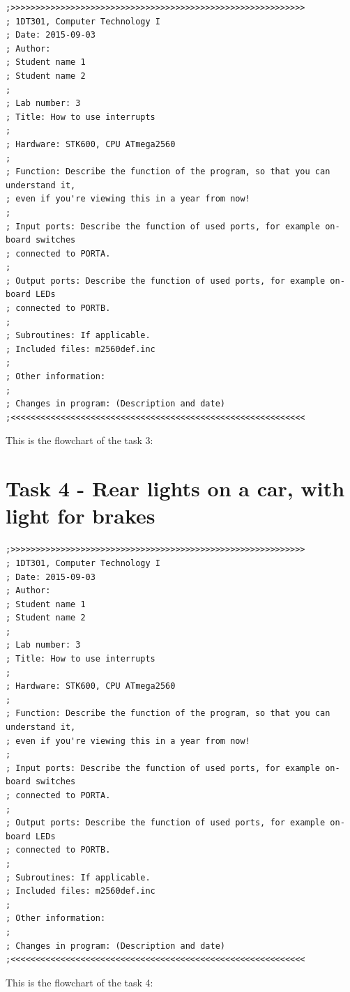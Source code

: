 \documentclass[a4paper,12pt]{article}
\begin{document}
\lstset{style=Asm}
\begin{lstlisting}
;>>>>>>>>>>>>>>>>>>>>>>>>>>>>>>>>>>>>>>>>>>>>>>>>>>>>>>>>>>>
; 1DT301, Computer Technology I
; Date: 2015-09-03
; Author:
; Student name 1
; Student name 2
;
; Lab number: 3
; Title: How to use interrupts
;
; Hardware: STK600, CPU ATmega2560
;
; Function: Describe the function of the program, so that you can understand it,
; even if you're viewing this in a year from now!
;
; Input ports: Describe the function of used ports, for example on-board switches
; connected to PORTA.
;
; Output ports: Describe the function of used ports, for example on-board LEDs
; connected to PORTB.
;
; Subroutines: If applicable.
; Included files: m2560def.inc
;
; Other information:
;
; Changes in program: (Description and date)
;<<<<<<<<<<<<<<<<<<<<<<<<<<<<<<<<<<<<<<<<<<<<<<<<<<<<<<<<<<<
\end{lstlisting}

\newpage
This is the flowchart of the task 3:
\begin{center}
\end{center}

\newpage
\section{Task 4 - Rear lights on a car, with light for brakes}

\lstset{style=Asm}
\begin{lstlisting}
;>>>>>>>>>>>>>>>>>>>>>>>>>>>>>>>>>>>>>>>>>>>>>>>>>>>>>>>>>>>
; 1DT301, Computer Technology I
; Date: 2015-09-03
; Author:
; Student name 1
; Student name 2
;
; Lab number: 3
; Title: How to use interrupts
;
; Hardware: STK600, CPU ATmega2560
;
; Function: Describe the function of the program, so that you can understand it,
; even if you're viewing this in a year from now!
;
; Input ports: Describe the function of used ports, for example on-board switches
; connected to PORTA.
;
; Output ports: Describe the function of used ports, for example on-board LEDs
; connected to PORTB.
;
; Subroutines: If applicable.
; Included files: m2560def.inc
;
; Other information:
;
; Changes in program: (Description and date)
;<<<<<<<<<<<<<<<<<<<<<<<<<<<<<<<<<<<<<<<<<<<<<<<<<<<<<<<<<<<
\end{lstlisting}

\newpage
This is the flowchart of the task 4:
\begin{center}
\end{center}


\end{document}

